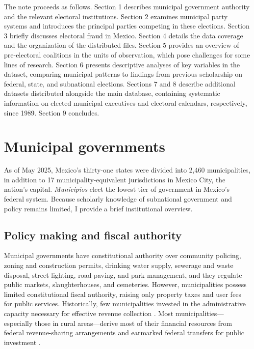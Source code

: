 \documentclass[letter,12pt]{article}
\begin{document}
The note proceeds as follows. Section 1 describes municipal government authority and the relevant electoral institutions. Section 2 examines municipal party systems and introduces the principal parties competing in these elections. Section 3 briefly discusses electoral fraud in Mexico. Section 4 details the data coverage and the organization of the distributed files. Section 5 provides an overview of pre-electoral coalitions in the units of observation, which pose challenges for some lines of research. Section 6 presents descriptive analyses of key variables in the dataset, comparing municipal patterns to findings from previous scholarship on federal, state, and subnational elections. Sections 7 and 8 describe additional datasets distributed alongside the main database, containing systematic information on elected municipal executives and electoral calendars, respectively, since 1989. Section 9 concludes.

\section{Municipal governments}

As of May 2025, Mexico's thirty-one states were divided into 2,460 municipalities, in addition to 17 municipality-equivalent jurisdictions in Mexico City, the nation's capital. \emph{Municipios} elect the lowest tier of government in Mexico's federal system. Because scholarly knowledge of subnational government and policy remains limited, I provide a brief institutional overview.

\subsection{Policy making and fiscal authority}

Municipal governments have constitutional authority over community policing, zoning and construction permits, drinking water supply, sewerage and waste disposal, street lighting, road paving, and park management, and they regulate public markets, slaughterhouses, and cemeteries. However, municipalities possess limited constitutional fiscal authority, raising only property taxes and user fees for public services. Historically, few municipalities invested in the administrative capacity necessary for effective revenue collection \citep{garfias.state.cap.2018}. Most municipalities---especially those in rural areas---derive most of their financial resources from federal revenue-sharing arrangements and earmarked federal transfers for public investment \citep{diaz.cayeros.2006, figueroa-mansur-itam.2024}.
\end{document}
